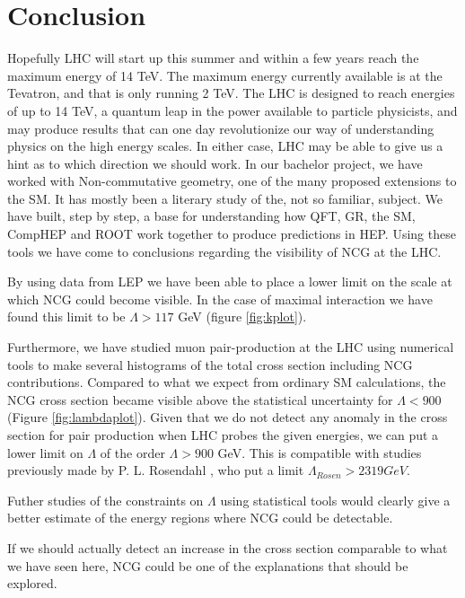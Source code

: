 \section{Conclusion}
Hopefully LHC will start up this summer and within a few years reach the maximum energy of 14 TeV. The maximum energy currently available is at the Tevatron, and that is only running 2 TeV. The LHC is designed to reach energies of up to 14 TeV, a quantum leap in the power available to particle physicists, and may produce results that can one day revolutionize our way of understanding physics on the high energy scales. In either case, LHC may be able to give us a hint as to which direction we should work. In our bachelor project, we have worked with Non-commutative geometry, one of the many proposed extensions to the SM. It has mostly been a literary study of the, not so familiar, subject. We have built, step by step, a base for understanding how QFT, GR, the SM, CompHEP and ROOT work together to produce predictions in HEP. Using these tools we have come to conclusions regarding the visibility of NCG at the LHC.

By using data from LEP we have been able to place a lower limit on the scale at which NCG could become visible. In the case of maximal interaction we have found this limit to be $\Lambda > 117$ GeV (figure \ref{fig:kplot}).

Furthermore, we have studied muon pair-production at the LHC using numerical tools to make several histograms of the total cross section including NCG contributions. Compared to what we expect from ordinary SM calculations, the NCG cross section became visible above the statistical uncertainty for $\Lambda < 900$ (Figure \ref{fig:lambdaplot}). Given that we do not detect any anomaly in the cross section for pair production when LHC probes the given energies, we can put a lower limit on $\Lambda$ of the order $\Lambda > 900$ GeV. This is compatible with studies previously made by P. L. Rosendahl \cite{rosendahl2008}, who put a limit $\Lambda_{Rosen} > 2319 GeV$.

Futher studies of the constraints on $\Lambda$ using statistical tools would clearly give a better estimate of the energy regions where NCG could be detectable.   

If we should actually detect an increase in the cross section comparable to what we have seen here, NCG could be one of the explanations that should be explored.



